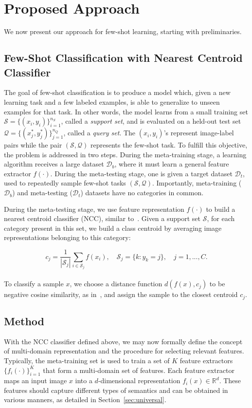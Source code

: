 \documentclass[runningheads]{llncs}
\newcommand\R{\mathbb{R}}
\begin{document}
\section{Proposed Approach}
We now present our approach for few-shot learning, starting
with preliminaries.

\subsection{Few-Shot Classification with Nearest Centroid Classifier}\label{sec:prelim}
The goal of few-shot classification is to produce a model which, given a new
learning task and a few labeled examples, is able to generalize to
unseen examples for that task. In other words, the model learns from a small
training set $\mathcal{S} = \{(x_i, y_i)\}_{i=1}^{n_S}$, called a
\textit{support set}, and is evaluated on a held-out test set $\mathcal{Q} =
\{(x^*_j, y^*_j)\}_{j=1}^{n_Q}$, called a \textit{query set}. The $(x_i, y_i)$'s
represent image-label pairs while the pair $(\mathcal{S}, \mathcal{Q})$ 
represents the few-shot task.
To fulfill this objective, the problem is addressed in two steps. During the
meta-training stage, a learning algorithm receives a large dataset
$\mathcal{D}_b$, where it must learn a
general feature extractor $f(\cdot)$.
During the meta-testing stage, one is given a target dataset $\mathcal{D}_t$,
used to repeatedly sample few-shot tasks $(\mathcal{S}, \mathcal{Q})$.
Importantly, meta-training ($\mathcal{D}_b$) and meta-testing ($\mathcal{D}_t$)
datasets have no categories in common.

During the meta-testing stage, we use feature representation $f(\cdot)$ to build
a nearest centroid classifier (NCC), similar
to~\cite{mensink2013distance,snell2017prototypical}. Given a support set
$\mathcal{S}$, for each category present in this set, we build a class centroid
by averaging image representations belonging to this category:

\begin{equation}\label{eq:centroid}
  c_j = \frac{1}{|\mathcal{S}_j|} \sum_{i \in \mathcal{S}_j} {f(x_i)}, \quad \mathcal{S}_j = \{k: y_k = j\}, \quad j = 1, ... ,C.
\end{equation}
\\
To classify a sample $x$, we choose a distance function $d(f(x), c_j)$ to be
negative cosine similarity, as
in~\cite{chen19closerfewshot,gidaris2018unsupervised}, and assign the sample to
the closest centroid $c_j$.


\subsection{Method}\label{sec:method}
With the NCC classifier defined above, we may now formally define the concept of multi-domain
representation and the procedure for selecting relevant features.
Typically, the meta-training set is used to train a set of $K$
feature extractors $\{f_i(\cdot)\}_{i=1}^{K}$ that form a multi-domain set of features.
Each feature extractor maps an input image $x$ into a $d$-dimensional
representation $f_i(x) \in \R^{d}$. 
These features should capture different types of semantics and can be obtained in various 
manners, as detailed
in Section~\ref{sec:universal}.
\end{document}

